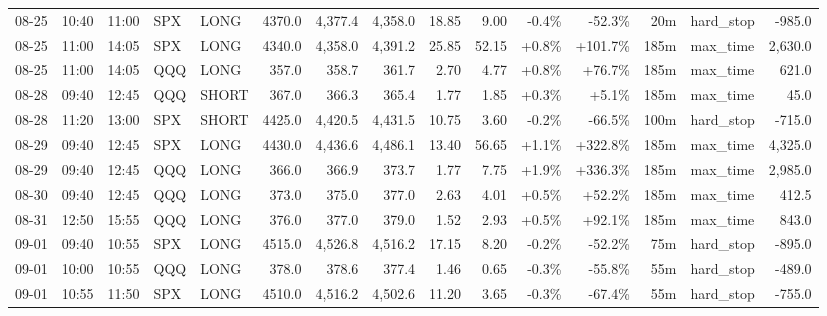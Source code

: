 \documentclass[11pt,a4paper,twoside]{article}
\begin{document}
\begin{landscape}
\begin{center}
\begin{longtable}{>{\color{txtmain}}l l l l l r r r r r r r r >{\color{txtmain}}l r}
08-25 & 10:40 & 11:00 & SPX & LONG & 4370.0 & 4,377.4 & 4,358.0 & 18.85 & 9.00 & \textcolor{lossred}{-0.4\%} & \textcolor{lossred}{-52.3\%} & 20m & hard\_stop & \textcolor{lossred}{-985.0} \\
08-25 & 11:00 & 14:05 & SPX & LONG & 4340.0 & 4,358.0 & 4,391.2 & 25.85 & 52.15 & \textcolor{wingreen}{+0.8\%} & \textcolor{wingreen}{+101.7\%} & 185m & max\_time & \textcolor{wingreen}{2,630.0} \\
08-25 & 11:00 & 14:05 & QQQ & LONG & 357.0 & 358.7 & 361.7 & 2.70 & 4.77 & \textcolor{wingreen}{+0.8\%} & \textcolor{wingreen}{+76.7\%} & 185m & max\_time & \textcolor{wingreen}{621.0} \\
08-28 & 09:40 & 12:45 & QQQ & SHORT & 367.0 & 366.3 & 365.4 & 1.77 & 1.85 & \textcolor{wingreen}{+0.3\%} & \textcolor{wingreen}{+5.1\%} & 185m & max\_time & \textcolor{wingreen}{45.0} \\
08-28 & 11:20 & 13:00 & SPX & SHORT & 4425.0 & 4,420.5 & 4,431.5 & 10.75 & 3.60 & \textcolor{lossred}{-0.2\%} & \textcolor{lossred}{-66.5\%} & 100m & hard\_stop & \textcolor{lossred}{-715.0} \\
08-29 & 09:40 & 12:45 & SPX & LONG & 4430.0 & 4,436.6 & 4,486.1 & 13.40 & 56.65 & \textcolor{wingreen}{+1.1\%} & \textcolor{wingreen}{+322.8\%} & 185m & max\_time & \textcolor{wingreen}{4,325.0} \\
08-29 & 09:40 & 12:45 & QQQ & LONG & 366.0 & 366.9 & 373.7 & 1.77 & 7.75 & \textcolor{wingreen}{+1.9\%} & \textcolor{wingreen}{+336.3\%} & 185m & max\_time & \textcolor{wingreen}{2,985.0} \\
08-30 & 09:40 & 12:45 & QQQ & LONG & 373.0 & 375.0 & 377.0 & 2.63 & 4.01 & \textcolor{wingreen}{+0.5\%} & \textcolor{wingreen}{+52.2\%} & 185m & max\_time & \textcolor{wingreen}{412.5} \\
08-31 & 12:50 & 15:55 & QQQ & LONG & 376.0 & 377.0 & 379.0 & 1.52 & 2.93 & \textcolor{wingreen}{+0.5\%} & \textcolor{wingreen}{+92.1\%} & 185m & max\_time & \textcolor{wingreen}{843.0} \\
09-01 & 09:40 & 10:55 & SPX & LONG & 4515.0 & 4,526.8 & 4,516.2 & 17.15 & 8.20 & \textcolor{lossred}{-0.2\%} & \textcolor{lossred}{-52.2\%} & 75m & hard\_stop & \textcolor{lossred}{-895.0} \\
09-01 & 10:00 & 10:55 & QQQ & LONG & 378.0 & 378.6 & 377.4 & 1.46 & 0.65 & \textcolor{lossred}{-0.3\%} & \textcolor{lossred}{-55.8\%} & 55m & hard\_stop & \textcolor{lossred}{-489.0} \\
09-01 & 10:55 & 11:50 & SPX & LONG & 4510.0 & 4,516.2 & 4,502.6 & 11.20 & 3.65 & \textcolor{lossred}{-0.3\%} & \textcolor{lossred}{-67.4\%} & 55m & hard\_stop & \textcolor{lossred}{-755.0} \\

\end{longtable}
\end{center}
\end{landscape}
\end{document}
